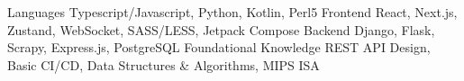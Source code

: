 
\begin{cvskills}
  \cvskill
    {Languages} %
    {Typescript/Javascript, Python, Kotlin, Perl5} %
  \cvskill
    {Frontend}
    {React, Next.js, Zustand, WebSocket, SASS/LESS, Jetpack Compose}
  \cvskill
    {Backend} %
    {Django, Flask, Scrapy, Express.js, PostgreSQL} %
  \cvskill
    {Foundational Knowledge}
    {REST API Design, Basic CI/CD, Data Structures \& Algorithms, MIPS ISA}
\end{cvskills}
